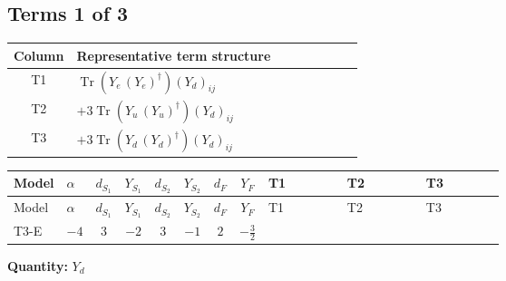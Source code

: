 \documentclass[8pt]{article}
\begin{document}
\begin{landscape}
\subsection*{Terms 1 of 3}
\begin{center}
\begin{tabular}{@{}c >{\raggedright\arraybackslash}p{0.82\linewidth}@{}}
\toprule
Column & Representative term structure \\
\midrule
T1 & \(\displaystyle \operatorname{Tr}\!\left({Y_e}\,\left({Y_e}\right)^{\dagger}\right) \left({Y_d}\right)_{ij}\) \\
\midrule
T2 & \(\displaystyle +3 \operatorname{Tr}\!\left({Y_u}\,\left({Y_u}\right)^{\dagger}\right) \left({Y_d}\right)_{ij}\) \\
\midrule
T3 & \(\displaystyle +3 \operatorname{Tr}\!\left({Y_d}\,\left({Y_d}\right)^{\dagger}\right) \left({Y_d}\right)_{ij}\) \\
\midrule
\bottomrule
\end{tabular}
\end{center}
\smallskip
\tiny
\begin{longtable}{@{}llcccccc >{\raggedright\arraybackslash}p{0.21\linewidth} >{\raggedright\arraybackslash}p{0.21\linewidth} >{\raggedright\arraybackslash}p{0.21\linewidth}@{}}
\toprule
Model & $\alpha$ & $d_{S_1}$ & $Y_{S_1}$ & $d_{S_2}$ & $Y_{S_2}$ & $d_F$ & $Y_F$ & T1 & T2 & T3 \\
\midrule
\endfirsthead
\toprule
Model & $\alpha$ & $d_{S_1}$ & $Y_{S_1}$ & $d_{S_2}$ & $Y_{S_2}$ & $d_F$ & $Y_F$ & T1 & T2 & T3 \\
\midrule
\endhead
T3-E & $-4$ & $3$ & $-2$ & $3$ & $-1$ & $2$ & $-\frac{3}{2}$ & \scriptsize\adjustbox{max width=\linewidth}{$\begin{gathered} \operatorname{Tr}\!\left({Y_e}\,\left({Y_e}\right)^{\dagger}\right) \left({Y_d}\right)_{ij}\end{gathered}$} & \scriptsize\adjustbox{max width=\linewidth}{$\begin{gathered} +3 \operatorname{Tr}\!\left({Y_u}\,\left({Y_u}\right)^{\dagger}\right) \left({Y_d}\right)_{ij}\end{gathered}$} & \scriptsize\adjustbox{max width=\linewidth}{$\begin{gathered} +3 \operatorname{Tr}\!\left({Y_d}\,\left({Y_d}\right)^{\dagger}\right) \left({Y_d}\right)_{ij}\end{gathered}$} \\
\midrule
\bottomrule
\end{longtable}
\clearpage
\noindent\textbf{Quantity: }$Y_d$\par\smallskip

\end{landscape}
\end{document}
